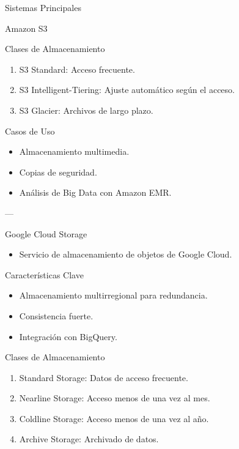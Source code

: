 \documentclass[presentation]{beamer}
\begin{document}
\begin{frame}[label={sec:org317cb5a}]{Sistemas Principales}
\begin{block}{Amazon S3}
\begin{block}{Clases de Almacenamiento}
\begin{enumerate}
\item \alert{\alert{S3 Standard:}} Acceso frecuente.
\item \alert{\alert{S3 Intelligent-Tiering:}} Ajuste automático según el acceso.
\item \alert{\alert{S3 Glacier:}} Archivos de largo plazo.
\end{enumerate}
\end{block}

\begin{block}{Casos de Uso}
\begin{itemize}
\item Almacenamiento multimedia.
\item Copias de seguridad.
\item Análisis de Big Data con Amazon EMR.
\end{itemize}

---
\end{block}
\end{block}

\begin{block}{Google Cloud Storage}
\begin{itemize}
\item Servicio de almacenamiento de objetos de Google Cloud.
\end{itemize}

\begin{block}{Características Clave}
\begin{itemize}
\item Almacenamiento multirregional para redundancia.
\item Consistencia fuerte.
\item Integración con BigQuery.
\end{itemize}
\end{block}

\begin{block}{Clases de Almacenamiento}
\begin{enumerate}
\item \alert{\alert{Standard Storage:}} Datos de acceso frecuente.
\item \alert{\alert{Nearline Storage:}} Acceso menos de una vez al mes.
\item \alert{\alert{Coldline Storage:}} Acceso menos de una vez al año.
\item \alert{\alert{Archive Storage:}} Archivado de datos.
\end{enumerate}
\end{block}


\end{block}
\end{frame}
\end{document}
